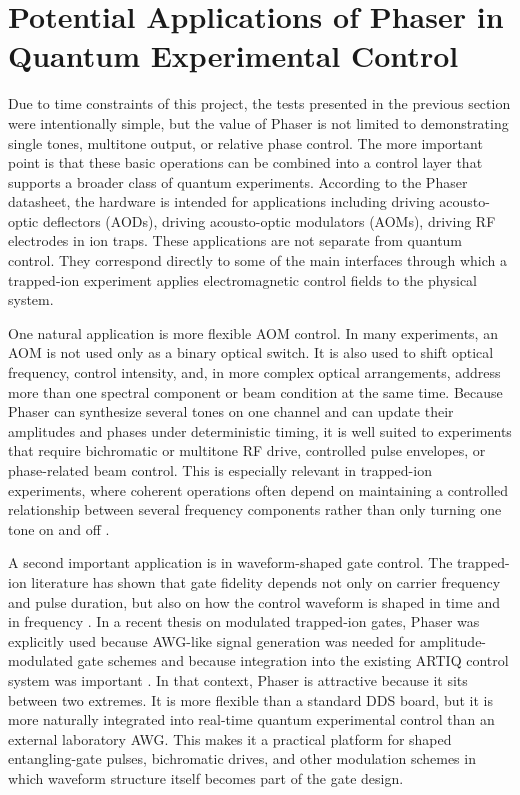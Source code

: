 \section{Potential Applications of Phaser in Quantum Experimental Control}

Due to time constraints of this project, the tests presented in the previous section were intentionally simple, but the value of Phaser is not limited to demonstrating single tones, multitone output, or relative phase control. The more important point is that these basic operations can be combined into a control layer that supports a broader class of quantum experiments. According to the Phaser datasheet, the hardware is intended for applications including driving acousto-optic deflectors (AODs), driving acousto-optic modulators (AOMs), driving RF electrodes in ion traps\cite{phaser_datasheet}. These applications are not separate from quantum control. They correspond directly to some of the main interfaces through which a trapped-ion experiment applies electromagnetic control fields to the physical system.

One natural application is more flexible AOM control. In many experiments, an AOM is not used only as a binary optical switch. It is also used to shift optical frequency, control intensity, and, in more complex optical arrangements, address more than one spectral component or beam condition at the same time. Because Phaser can synthesize several tones on one channel and can update their amplitudes and phases under deterministic timing, it is well suited to experiments that require bichromatic or multitone RF drive, controlled pulse envelopes, or phase-related beam control. This is especially relevant in trapped-ion experiments, where coherent operations often depend on maintaining a controlled relationship between several frequency components rather than only turning one tone on and off \cite{artiq_coredrivers, bruzewicz2019, kofler2025}.

A second important application is in waveform-shaped gate control. The trapped-ion literature has shown that gate fidelity depends not only on carrier frequency and pulse duration, but also on how the control waveform is shaped in time and in frequency \cite{bruzewicz2019}. In a recent thesis on modulated trapped-ion gates, Phaser was explicitly used because AWG-like signal generation was needed for amplitude-modulated gate schemes and because integration into the existing ARTIQ control system was important \cite{kofler2025}. In that context, Phaser is attractive because it sits between two extremes. It is more flexible than a standard DDS board, but it is more naturally integrated into real-time quantum experimental control than an external laboratory AWG. This makes it a practical platform for shaped entangling-gate pulses, bichromatic drives, and other modulation schemes in which waveform structure itself becomes part of the gate design.

